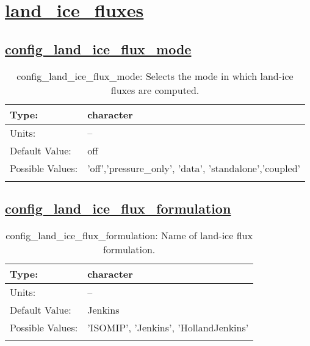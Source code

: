 \section[land\_ice\_fluxes]{\hyperref[sec:nm_tab_land_ice_fluxes]{land\_ice\_fluxes}}
\label{sec:nm_sec_land_ice_fluxes}
\subsection[config\_land\_ice\_flux\_mode]{\hyperref[sec:nm_tab_land_ice_fluxes]{config\_land\_ice\_flux\_mode}}
\label{subsec:nm_sec_config_land_ice_flux_mode}
\begin{center}
\begin{longtable}{| p{2.0in} || p{4.0in} |}
    \hline
    Type: & character \\
    \hline
    Units: & -- \\
    \hline
    Default Value: & off \\
    \hline
    Possible Values: & 'off','pressure\_only', 'data', 'standalone','coupled' \\
    \hline
    \caption{config\_land\_ice\_flux\_mode: Selects the mode in which land-ice fluxes are computed.}
\end{longtable}
\end{center}
\subsection[config\_land\_ice\_flux\_formulation]{\hyperref[sec:nm_tab_land_ice_fluxes]{config\_land\_ice\_flux\_formulation}}
\label{subsec:nm_sec_config_land_ice_flux_formulation}
\begin{center}
\begin{longtable}{| p{2.0in} || p{4.0in} |}
    \hline
    Type: & character \\
    \hline
    Units: & -- \\
    \hline
    Default Value: & Jenkins \\
    \hline
    Possible Values: & 'ISOMIP', 'Jenkins', 'HollandJenkins' \\
    \hline
    \caption{config\_land\_ice\_flux\_formulation: Name of land-ice flux formulation.}
\end{longtable}
\end{center}
